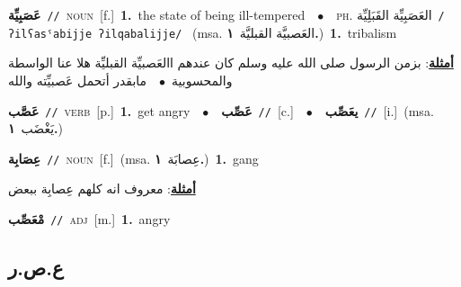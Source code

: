\documentclass[10pt,a4paper,twoside]{article} %
\begin{document}
\begin{multicols}{2}
{\setlength\topsep{0pt}\textbf{\foreignlanguage{arabic}{عَصَبِيِّة}}\ {\color{gray}\texttt{//}\color{black}}\ \textsc{noun}\ [f.]\ \textbf{1.}~the state of being ill-tempered\ \ $\bullet$\ \ \textsc{ph.} \color{gray} \foreignlanguage{arabic}{العَصَبِيِّة القَبَلِيِّة}\color{black}\ {\color{gray}\texttt{/{\sffamily ʔilʕasˤabijje ʔilqabalijje}/}\color{black}}\ \color{gray} (msa. \foreignlanguage{arabic}{العَصبيَّة القبليَّة}~\foreignlanguage{arabic}{\textbf{١.}})\color{black}\ \textbf{1.}~tribalism\  \begin{flushright}\color{gray}\foreignlanguage{arabic}{\textbf{\underline{\foreignlanguage{arabic}{أمثلة}}}: بزمن الرسول صلى الله عليه وسلم كان عندهم االعَصبيِّة القبليِّة هلا عنا الواسطة والمحسوبية\ $\bullet$\ \  مابقدر أتحمل عَصبيِّته والله}\end{flushright}\color{black}} \vspace{2mm}

{\setlength\topsep{0pt}\textbf{\foreignlanguage{arabic}{عَصَّب}}\ {\color{gray}\texttt{//}\color{black}}\ \textsc{verb}\ [p.]\ \textbf{1.}~get angry\ \ $\bullet$\ \ \setlength\topsep{0pt}\textbf{\foreignlanguage{arabic}{عَصِّب}}\ {\color{gray}\texttt{//}\color{black}}\ [c.]\ \ $\bullet$\ \ \setlength\topsep{0pt}\textbf{\foreignlanguage{arabic}{يعَصِّب}}\ {\color{gray}\texttt{//}\color{black}}\ [i.]\ \color{gray}(msa. \foreignlanguage{arabic}{يَغْضَب}~\foreignlanguage{arabic}{\textbf{١.}})\color{black}\ } \vspace{2mm}

{\setlength\topsep{0pt}\textbf{\foreignlanguage{arabic}{عِصَابِة}}\ {\color{gray}\texttt{//}\color{black}}\ \textsc{noun}\ [f.]\ \color{gray}(msa. \foreignlanguage{arabic}{عِصابَة}~\foreignlanguage{arabic}{\textbf{١.}})\color{black}\ \textbf{1.}~gang\  \begin{flushright}\color{gray}\foreignlanguage{arabic}{\textbf{\underline{\foreignlanguage{arabic}{أمثلة}}}: معروف انه كلهم عِصابِة ببعض}\end{flushright}\color{black}} \vspace{2mm}

{\setlength\topsep{0pt}\textbf{\foreignlanguage{arabic}{مْعَصِّب}}\ {\color{gray}\texttt{//}\color{black}}\ \textsc{adj}\ [m.]\ \textbf{1.}~angry\ } \vspace{2mm}

\vspace{-3mm}
\subsection*{\color{blue}\foreignlanguage{arabic}{ع.ص.ر}\color{blue}{}} 


\end{multicols}
\end{document}
